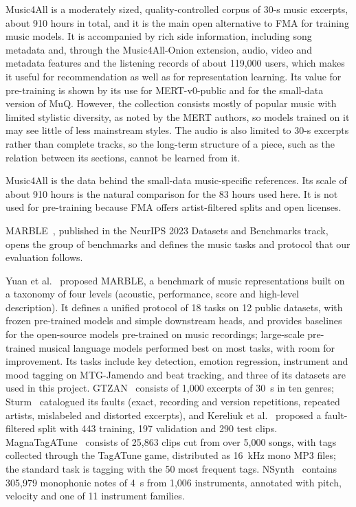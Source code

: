 \documentclass{FastFyp}
\begin{document}
\lrcritical
Music4All is a moderately sized, quality-controlled corpus of 30-s music excerpts, about 910 hours in total, and it is the main open alternative to FMA for training music models. It is accompanied by rich side information, including song metadata and, through the Music4All-Onion extension, audio, video and metadata features and the listening records of about 119,000 users, which makes it useful for recommendation as well as for representation learning. Its value for pre-training is shown by its use for MERT-v0-public and for the small-data version of MuQ. However, the collection consists mostly of popular music with limited stylistic diversity, as noted by the MERT authors, so models trained on it may see little of less mainstream styles. The audio is also limited to 30-s excerpts rather than complete tracks, so the long-term structure of a piece, such as the relation between its sections, cannot be learned from it.

\lrrelation
Music4All is the data behind the small-data music-specific references. Its scale of about 910 hours is the natural comparison for the 83 hours used here. It is not used for pre-training because FMA offers artist-filtered splits and open licenses.

MARBLE~\cite{ref:Yuan:2023marble}, published in the NeurIPS 2023 Datasets and Benchmarks track, opens the group of benchmarks and defines the music tasks and protocol that our evaluation follows.

\lrsummary
Yuan et al.~\cite{ref:Yuan:2023marble} proposed MARBLE, a benchmark of music representations built on a taxonomy of four levels (acoustic, performance, score and high-level description). It defines a unified protocol of 18 tasks on 12 public datasets, with frozen pre-trained models and simple downstream heads, and provides baselines for the open-source models pre-trained on music recordings; large-scale pre-trained musical language models performed best on most tasks, with room for improvement. Its tasks include key detection, emotion regression, instrument and mood tagging on MTG-Jamendo and beat tracking, and three of its datasets are used in this project. GTZAN~\cite{ref:Tzanetakis:2002genre} consists of 1,000 excerpts of 30~s in ten genres; Sturm~\cite{ref:Sturm:2013gtzan} catalogued its faults (exact, recording and version repetitions, repeated artists, mislabeled and distorted excerpts), and Kereliuk et al.~\cite{ref:Kereliuk:2015adversaries} proposed a fault-filtered split with 443 training, 197 validation and 290 test clips. MagnaTagATune~\cite{ref:Law:2009tagatune} consists of 25,863 clips cut from over 5,000 songs, with tags collected through the TagATune game, distributed as 16~kHz mono MP3 files; the standard task is tagging with the 50 most frequent tags. NSynth~\cite{ref:Engel:2017nsynth} contains 305,979 monophonic notes of 4~s from 1,006 instruments, annotated with pitch, velocity and one of 11 instrument families.
\end{document}
